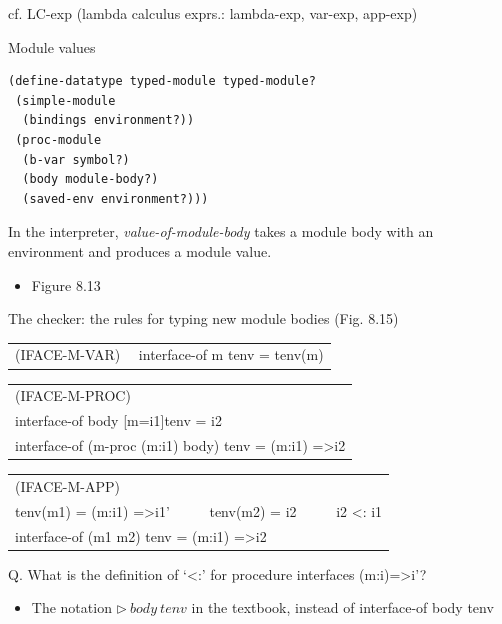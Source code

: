 \documentclass{article}
\begin{document}
\begin{huge}
\begin{itemize}
\end{itemize}

cf. LC-exp (lambda calculus exprs.: lambda-exp, var-exp, app-exp)


Module values
\begin{lstlisting}[language=Lisp]
(define-datatype typed-module typed-module?
 (simple-module
  (bindings environment?))
 (proc-module
  (b-var symbol?)
  (body module-body?)
  (saved-env environment?)))
\end{lstlisting}

In the interpreter, {\it value-of-module-body} takes a module body with an environment and
produces a module value.
\begin{itemize}
\item Figure 8.13
\end{itemize}


The checker: the rules for typing new module bodies (Fig. 8.15)

\begin{tabular}{l}
(IFACE-M-VAR) \ \
interface-of m tenv = tenv(m)
\end{tabular}

\begin{tabular}{l}
(IFACE-M-PROC) \\
interface-of body [m=i1]tenv = i2 \\ \hline
interface-of (m-proc (m:i1) body) tenv =  (m:i1) =\textgreater i2
\end{tabular}

\begin{tabular}{l}
(IFACE-M-APP) \\
tenv(m1) =  (m:i1) =\textgreater i1' \ \ \ \ \ 
tenv(m2) =  i2 \ \ \ \ \ 
i2 \textless: i1 \\ \hline
interface-of (m1 m2) tenv =  (m:i1) =\textgreater i2
\end{tabular}

Q. What is the definition of `\textless:' for procedure interfaces (m:i)=\textgreater i'?

\begin{itemize}
\item The notation $\rhd \ body \ tenv$ in the textbook, instead of interface-of body tenv 
\end{itemize}


\end{huge}
\end{document}
